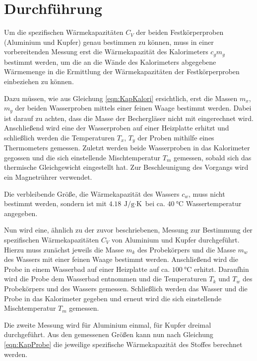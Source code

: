 \section{Durchführung}
\label{sec:Durchführung}

Um die spezifischen Wärmekapazitäten $C_V$ der beiden Festkörperproben 
(Aluminium und Kupfer) genau bestimmen zu können, muss in einer 
vorbereitenden Messung erst die Wärmekapazität des Kalorimeters $c_gm_g$ 
bestimmt werden, um die an die Wände des Kalorimeters abgegebene Wärmemenge 
in die Ermittlung der Wärmekapazitäten der Festkörperproben einbeziehen zu 
können.

Dazu müssen, wie aus Gleichung \ref{eqn:KapKalori} ersichtlich,
erst die Massen $m_x$, $m_y$ der beiden Wasserproben mittels einer 
feinen Waage bestimmt werden. Dabei ist darauf zu achten, dass die 
Masse der Bechergläser nicht mit eingerechnet wird. Anschließend wird eine 
der Wasserproben auf einer Heizplatte erhitzt und schließlich werden die
Temperaturen $T_x$, $T_y$ der Proben mithilfe eines Thermometers gemessen.
Zuletzt werden beide Wasserproben in das Kalorimeter gegossen und die sich 
einstellende Mischtemperatur $T_m$ gemessen, sobald sich das thermische 
Gleichgewicht eingestellt hat. Zur Beschleunigung des Vorgangs wird ein 
Magnetrührer verwendet.

Die verbleibende Größe, die Wärmekapazität des Wassers $c_w$, muss nicht 
bestimmt werden, sondern ist mit $\SI{4.18}{\joule\per\gram\cdot\kelvin}$ 
bei ca. $\SI{40}{\celsius}$ Wassertemperatur angegeben.


Nun wird eine, ähnlich zu der zuvor beschriebenen, Messung zur Bestimmung
der spezifischen Wärmekapazitäten $C_V$ von Aluminium und Kupfer durchgeführt. 
Hierzu muss zunächst jeweils die Masse $m_k$ des Probekörpers und die Masse $m_w$ 
des Wassers mit einer feinen Waage bestimmt werden. Anschließend wird die Probe 
in einem Wasserbad auf einer Heizplatte auf ca. $\SI{100}{\celsius}$ erhitzt. 
Daraufhin wird die Probe dem Wasserbad entnommen und die Temperaturen $T_k$
und $T_w$ des Probekörpers und des Wassers gemessen.
Schließlich werden das Wasser und die Probe in das Kalorimeter gegeben und 
erneut wird die sich einstellende Mischtemperatur $T_m$ gemessen.

Die zweite Messung wird für Aluminium einmal, für Kupfer dreimal durchgeführt. 
Aus den gemessenen Größen kann nun nach Gleichung \ref{eqn:KapProbe} die 
jeweilige spezifische Wärmekapazität des Stoffes berechnet werden.









